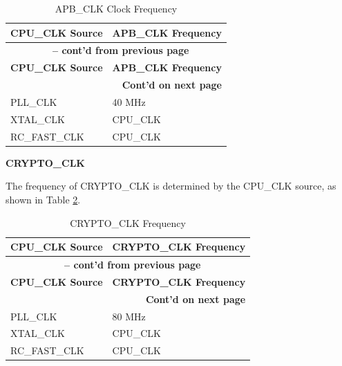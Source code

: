 \documentclass[main\_\_EN.tex]{subfiles}
\begin{document}
 \begin{longtable}[c]{ |p{5cm}|p{5cm}| }
      \caption{APB\_CLK Clock Frequency}
    \label{tab:resclk-apb-clk-freq} \\
        \hline
        \rowcolor{lightgray}
            \textbf{CPU\_CLK Source} & \textbf{APB\_CLK Frequency} \\\hline
        \endfirsthead

        \multicolumn{2}{c}{\bfseries \tablename\ \thetable{} -- cont'd from previous page}\\\hline
        \rowcolor{lightgray}
        \textbf{CPU\_CLK Source} & \textbf{APB\_CLK Frequency} \\\hline
        \endhead
        \multicolumn{2}{r}{\textbf{Cont'd on next page}} \\
        \endfoot
        \endlastfoot
        \hline
        PLL\_CLK & 40 MHz \\
        \hline
        XTAL\_CLK & CPU\_CLK \\
        \hline
        RC\_FAST\_CLK & CPU\_CLK \\
        \hline
\end{longtable}


\textbf{CRYPTO\_CLK}

The frequency of CRYPTO\_CLK is determined by the CPU\_CLK source, as shown in Table \ref{tab:resclk-crypto-clk-freq}.

 \begin{longtable}[c]{ |p{5cm}|p{5cm}| }
      \caption{CRYPTO\_CLK Frequency}
    \label{tab:resclk-crypto-clk-freq} \\
        \hline
    \rowcolor{lightgray}
        \textbf{CPU\_CLK Source} & \textbf{CRYPTO\_CLK Frequency} \\
        \hline
        \endfirsthead
        \multicolumn{2}{c}{\bfseries \tablename\ \thetable{} -- cont'd from previous page}\\\hline

    \rowcolor{lightgray}
        \textbf{CPU\_CLK Source} & \textbf{CRYPTO\_CLK Frequency} \\\hline
        \endhead
        \multicolumn{2}{r}{\textbf{Cont'd on next page}} \\
        \endfoot
        \endlastfoot
        \hline
        PLL\_CLK & 80 MHz \\
        \hline
        XTAL\_CLK & CPU\_CLK \\
        \hline
        RC\_FAST\_CLK & CPU\_CLK \\
        \hline
\end{longtable}
\end{document}
